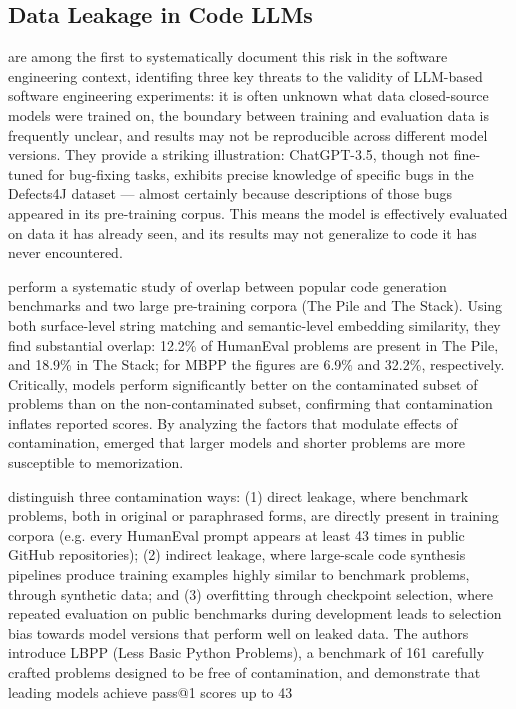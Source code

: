 \documentclass[mscthesis]{usiinfthesis}
\begin{document}
\subsection{Data Leakage in Code LLMs}
\citet{Sallou_2024} are among the first to systematically document this risk in the software engineering context, identifing three key threats to the validity of LLM-based software engineering experiments:  it is often unknown what data closed-source models were trained on, the boundary between training and evaluation data is frequently unclear, and results may not be reproducible across different model versions. They provide a striking illustration: ChatGPT-3.5, though not fine-tuned for bug-fixing tasks, exhibits precise knowledge of specific bugs in the Defects4J dataset — almost certainly because descriptions of those bugs appeared in its pre-training corpus. This means the model is effectively evaluated on data it has already seen, and its results may not generalize to code it has never encountered.
\par\vspace{1em}
\citet{riddell2024quantifyingcontaminationevaluatingcode} perform a systematic study of overlap between popular code generation benchmarks and two large pre-training corpora (The Pile and The Stack). Using both surface-level string matching and semantic-level embedding similarity, they find substantial overlap: 12.2\% of HumanEval problems are present in The Pile, and 18.9\% in The Stack; for MBPP the figures are 6.9\% and 32.2\%, respectively. Critically, models perform significantly better on the contaminated subset of problems than on the non-contaminated subset, confirming that contamination inflates reported scores.  By analyzing the factors that modulate effects of contamination, emerged that larger models and shorter problems are more susceptible to memorization.
\par\vspace{1em}
\citet{matton2024leakagecodegenerationevaluation} distinguish three contamination ways: (1) direct leakage, where benchmark problems, both in original or paraphrased forms, are directly present in training corpora (e.g. every HumanEval prompt appears at least 43 times in public GitHub repositories); (2) indirect leakage, where large-scale code synthesis pipelines produce training examples highly similar to benchmark problems,  through synthetic data; and (3) overfitting through checkpoint selection, where repeated evaluation on public benchmarks during development leads to selection bias towards model versions that perform well on leaked data. The authors introduce LBPP (Less Basic Python Problems), a benchmark of 161 carefully crafted problems designed to be free of contamination, and demonstrate that leading models achieve pass@1 scores up to 43%
\end{document}
